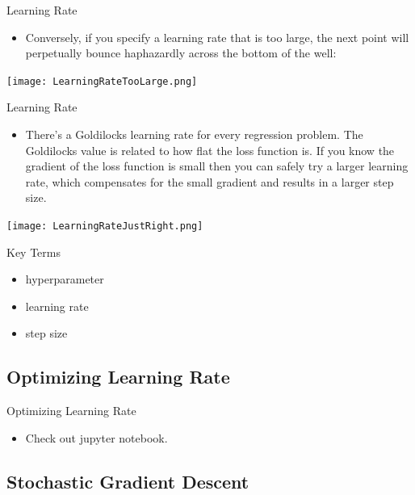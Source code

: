 \documentclass{beamer}
\begin{document}
\begin{frame}{Learning Rate}
\begin{itemize}
    \item Conversely, if you specify a learning rate that is too large, the next point will perpetually bounce haphazardly across the bottom of the well:
\end{itemize}
\texttt{[image: LearningRateTooLarge.png]}
\end{frame}

\begin{frame}{Learning Rate}
\begin{itemize}
    \item There's a Goldilocks learning rate for every regression problem. The Goldilocks value is related to how flat the loss function is. If you know the gradient of the loss function is small then you can safely try a larger learning rate, which compensates for the small gradient and results in a larger step size.
\end{itemize}
\texttt{[image: LearningRateJustRight.png]}
\end{frame}

\begin{frame}{Key Terms}
\begin{itemize}
    \item hyperparameter
    \item learning rate
    \item step size
\end{itemize}
\end{frame}

\subsection{Optimizing Learning Rate}

\begin{frame}{Optimizing Learning Rate}
\begin{itemize}
    \item Check out jupyter notebook.
\end{itemize}
\end{frame}

\subsection{Stochastic Gradient Descent}
\end{document}
